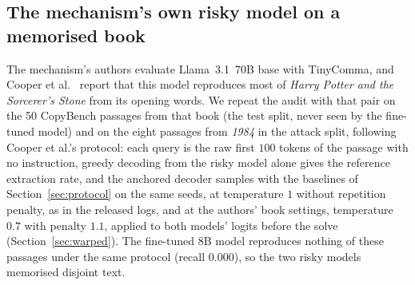 \subsection{The mechanism's own risky model on a memorised book}\label{sec:natural}
The mechanism's authors evaluate Llama~3.1~70B base with TinyComma, and Cooper et al.~\cite{cooper2025extracting} report that this model reproduces most of \emph{Harry Potter and the Sorcerer's Stone} from its opening words. We repeat the audit with that pair on the 50 CopyBench passages from that book (the test split, never seen by the fine-tuned model) and on the eight passages from \emph{1984} in the attack split, following Cooper et al.'s protocol: each query is the raw first $100$ tokens of the passage with no instruction, greedy decoding from the risky model alone gives the reference extraction rate, and the anchored decoder samples with the baselines of Section~\ref{sec:protocol} on the same seeds, at temperature $1$ without repetition penalty, as in the released logs, and at the authors' book settings, temperature $0.7$ with penalty $1.1$, applied to both models' logits before the solve (Section~\ref{sec:warped}). The fine-tuned 8B model reproduces nothing of these passages under the same protocol (recall $0.000$), so the two risky models memorised disjoint text.

